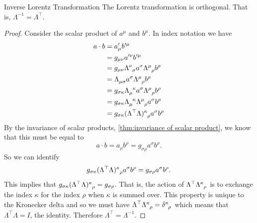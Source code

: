 \documentclass[fleqn]{NotesClass}
\newcommand*{\trans}{\top}
\begin{document}
    \begin{crl}{Inverse Lorentz Transformation}{}
        The Lorentz transformation is orthogonal.
        That is, \(\Lambda^{-1} = \Lambda^\trans\).
        
        \begin{proof}
            Consider the scalar product of \(a^\mu\) and \(b^\mu\).
            In index notation we have
            \begin{align}
                a\cdot b &= a'_\mu b'^\mu\\
                &= g_{\mu\nu}a'^\nu b'^\mu\\
                &= g_{\mu\nu} \tensor{\Lambda}{^\nu_\sigma}a^\sigma \tensor{\Lambda}{^\mu_\rho} b^\rho\\
                &= \tensor{\Lambda}{_\mu_\sigma}a^\sigma \tensor{\Lambda}{^\mu_\rho} b^\rho\\
                &= g_{\sigma\kappa}\tensor{\Lambda}{_\mu^\kappa}a^\sigma\tensor{\Lambda}{^\mu_\rho}b^\rho\\
                &= g_{\sigma\kappa}\tensor{\Lambda}{_\mu^\kappa}\tensor{\Lambda}{^\mu_\rho}a^\sigma b^\rho\\
                &= g_{\sigma\kappa}\tensor{(\Lambda^\trans\Lambda)}{^\kappa_\rho} a^\sigma b^\rho
           \end{align}
            By the invariance of scalar products, \cref{thm:invariance of scalar product}, we know that this must be equal to
            \begin{equation}
                a\cdot b = a_\rho b^\rho = g_{\sigma\rho} a^\sigma b^\rho.
            \end{equation}
            So we can identify
            \begin{equation}
                g_{\sigma\kappa}\tensor{(\Lambda^\trans\Lambda)}{^\kappa_\rho} a^\sigma b^\rho = g_{\sigma\rho} a^\sigma b^\rho.
            \end{equation}
            This implies that \(g_{\sigma\kappa}\tensor{(\Lambda^\trans\Lambda)}{^\kappa_\rho} = g_{\sigma\rho}\).
            That is, the action of \(\tensor{\Lambda^\trans\Lambda}{^\kappa_\rho}\) is to exchange the index \(\kappa\) for the index \(\rho\) when \(\kappa\) is summed over.
            This property is unique to the Kronecker delta and so we must have \(\tensor{\Lambda^\trans\Lambda}{^\kappa_\rho} = \tensor{\delta}{^\kappa_\rho}\) which means that \(\Lambda^\trans\Lambda = I\), the identity.
            Therefore \(\Lambda^\trans = \Lambda^{-1}\).
        \end{proof}
    \end{crl}
    
\end{document}
